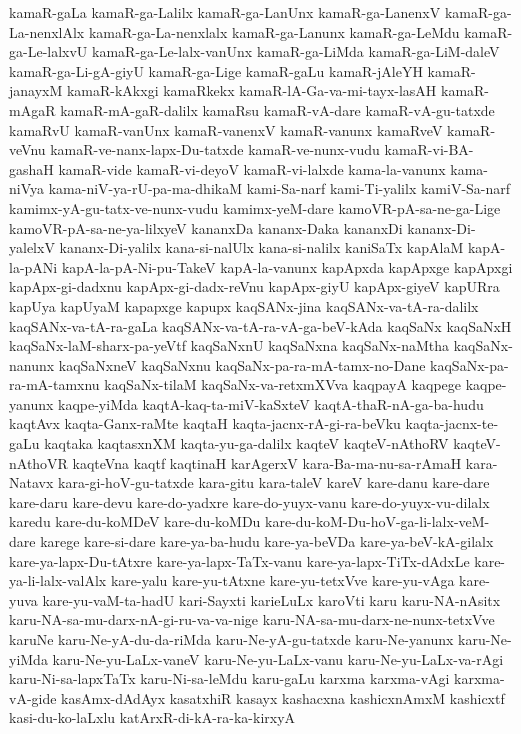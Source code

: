 {kamaR-gaLa
kamaR-ga-Lalilx
kamaR-ga-LanUnx
kamaR-ga-LanenxV
kamaR-ga-La-nenxlAlx
kamaR-ga-La-nenxlalx
kamaR-ga-Lanunx
kamaR-ga-LeMdu
kamaR-ga-Le-lalxvU
kamaR-ga-Le-lalx-vanUnx
kamaR-ga-LiMda
kamaR-ga-LiM-daleV
kamaR-ga-Li-gA-giyU
kamaR-ga-Lige
kamaR-gaLu
kamaR-jAleYH
kamaR-janayxM
kamaR-kAkxgi
kamaRkekx
kamaR-lA-Ga-va-mi-tayx-lasAH
kamaR-mAgaR
kamaR-mA-gaR-dalilx
kamaRsu
kamaR-vA-dare
kamaR-vA-gu-tatxde
kamaRvU
kamaR-vanUnx
kamaR-vanenxV
kamaR-vanunx
kamaRveV
kamaR-veVnu
kamaR-ve-nanx-lapx-Du-tatxde
kamaR-ve-nunx-vudu
kamaR-vi-BA-gashaH
kamaR-vide
kamaR-vi-deyoV
kamaR-vi-lalxde
kama-la-vanunx
kama-niVya
kama-niV-ya-rU-pa-ma-dhikaM
kami-Sa-narf
kami-Ti-yalilx
kamiV-Sa-narf
kamimx-yA-gu-tatx-ve-nunx-vudu
kamimx-yeM-dare
kamoVR-pA-sa-ne-ga-Lige
kamoVR-pA-sa-ne-ya-lilxyeV
kananxDa
kananx-Daka
kananxDi
kananx-Di-yalelxV
kananx-Di-yalilx
kana-si-nalUlx
kana-si-nalilx
kaniSaTx
kapAlaM
kapA-la-pANi
kapA-la-pA-Ni-pu-TakeV
kapA-la-vanunx
kapApxda
kapApxge
kapApxgi
kapApx-gi-dadxnu
kapApx-gi-dadx-reVnu
kapApx-giyU
kapApx-giyeV
kapURra
kapUya
kapUyaM
kapapxge
kapupx
kaqSANx-jina
kaqSANx-va-tA-ra-dalilx
kaqSANx-va-tA-ra-gaLa
kaqSANx-va-tA-ra-vA-ga-beV-kAda
kaqSaNx
kaqSaNxH
kaqSaNx-laM-sharx-pa-yeVtf
kaqSaNxnU
kaqSaNxna
kaqSaNx-naMtha
kaqSaNx-nanunx
kaqSaNxneV
kaqSaNxnu
kaqSaNx-pa-ra-mA-tamx-no-Dane
kaqSaNx-pa-ra-mA-tamxnu
kaqSaNx-tilaM
kaqSaNx-va-retxmXVva
kaqpayA
kaqpege
kaqpe-yanunx
kaqpe-yiMda
kaqtA-kaq-ta-miV-kaSxteV
kaqtA-thaR-nA-ga-ba-hudu
kaqtAvx
kaqta-Ganx-raMte
kaqtaH
kaqta-jacnx-rA-gi-ra-beVku
kaqta-jacnx-te-gaLu
kaqtaka
kaqtasxnXM
kaqta-yu-ga-dalilx
kaqteV
kaqteV-nAthoRV
kaqteV-nAthoVR
kaqteVna
kaqtf
kaqtinaH
karAgerxV
kara-Ba-ma-nu-sa-rAmaH
kara-Natavx
kara-gi-hoV-gu-tatxde
kara-gitu
kara-taleV
kareV
kare-danu
kare-dare
kare-daru
kare-devu
kare-do-yadxre
kare-do-yuyx-vanu
kare-do-yuyx-vu-dilalx
karedu
kare-du-koMDeV
kare-du-koMDu
kare-du-koM-Du-hoV-ga-li-lalx-veM-dare
karege
kare-si-dare
kare-ya-ba-hudu
kare-ya-beVDa
kare-ya-beV-kA-gilalx
kare-ya-lapx-Du-tAtxre
kare-ya-lapx-TaTx-vanu
kare-ya-lapx-TiTx-dAdxLe
kare-ya-li-lalx-valAlx
kare-yalu
kare-yu-tAtxne
kare-yu-tetxVve
kare-yu-vAga
kare-yuva
kare-yu-vaM-ta-hadU
kari-Sayxti
karieLuLx
karoVti
karu
karu-NA-nAsitx
karu-NA-sa-mu-darx-nA-gi-ru-va-va-nige
karu-NA-sa-mu-darx-ne-nunx-tetxVve
karuNe
karu-Ne-yA-du-da-riMda
karu-Ne-yA-gu-tatxde
karu-Ne-yanunx
karu-Ne-yiMda
karu-Ne-yu-LaLx-vaneV
karu-Ne-yu-LaLx-vanu
karu-Ne-yu-LaLx-va-rAgi
karu-Ni-sa-lapxTaTx
karu-Ni-sa-leMdu
karu-gaLu
karxma
karxma-vAgi
karxma-vA-gide
kasAmx-dAdAyx
kasatxhiR
kasayx
kashacxna
kashicxnAmxM
kashicxtf
kasi-du-ko-laLxlu
katArxR-di-kA-ra-ka-kirxyA
}
